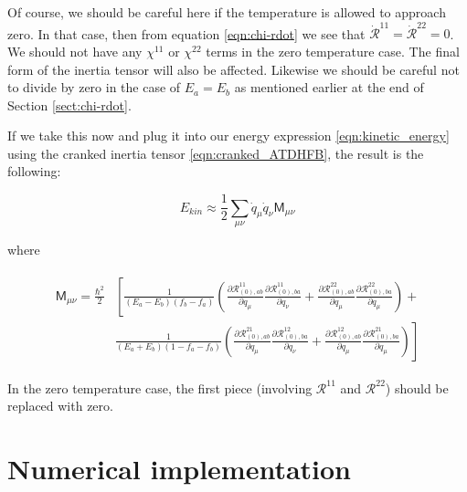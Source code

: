 \noindent Of course, we should be careful here if the temperature is allowed to approach zero. In that case, then from equation \ref{eqn:chi-rdot} we see that $\mathcal{\dot{R}}^{11}=\mathcal{\dot{R}}^{22}=0$. We should not have any $\chi^{11}$ or $\chi^{22}$ terms in the zero temperature case. The final form of the inertia tensor will also be affected. Likewise we should be careful not to divide by zero in the case of $E_a=E_b$ as mentioned earlier at the end of Section \ref{sect:chi-rdot}.%

If we take this now and plug it into our energy expression \ref{eqn:kinetic_energy} using the cranked inertia tensor \ref{eqn:cranked_ATDHFB}, the result is the following:

\begin{tcolorbox}
	\begin{equation}
	E_{kin} \approx \frac{1}{2}\sum_{\mu\nu}\dot{q}_\mu\dot{q}_\nu\mathsf{M}_{\mu\nu}
	\end{equation}
\end{tcolorbox}

\noindent where

\begin{tcolorbox}
	\begin{align}\label{crankedFiniteTempInertia}
	\begin{aligned}
	\mathsf{M}_{\mu\nu} =  \frac{\hbar^2}{2}&\left[\frac{1}{(E_a-E_b)(f_b-f_a)}\left(\frac{\partial\mathcal{R}^{11}_{(0),ab}}{\partial q_\mu}\frac{\partial\mathcal{R}^{11}_{(0),ba}}{\partial q_\nu}+\frac{\partial\mathcal{R}^{22}_{(0),ab}}{\partial q_\mu}\frac{\partial\mathcal{R}^{22}_{(0),ba}}{\partial q_\mu}\right)\right.+ \\
	&\left.\frac{1}{(E_a+E_b)(1-f_a-f_b)}\left(\frac{\partial\mathcal{R}^{21}_{(0),ab}}{\partial q_\mu}\frac{\partial\mathcal{R}^{12}_{(0),ba}}{\partial q_\nu}+\frac{\partial\mathcal{R}^{12}_{(0),ab}}{\partial q_\mu}\frac{\partial\mathcal{R}^{21}_{(0),ba}}{\partial q_\mu}\right)\right]
	\end{aligned}
	\end{align}
\end{tcolorbox}

\noindent In the zero temperature case, the first piece (involving $\mathcal{R}^{11}$ and $\mathcal{R}^{22}$) should be replaced with zero.

\section{Numerical implementation}

